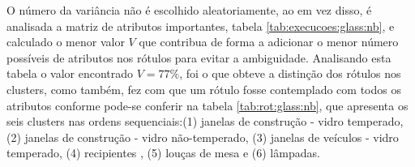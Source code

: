 \begin{table}[!h]
\centering
\caption{Matriz de Atributos Importantes do algoritmo Naive Bayes na base Glass}
\label{tab:execucoes:glass:nb}
\end{table}    


O número da variância não é escolhido aleatoriamente, ao em vez disso, é analisada a matriz de atributos importantes, tabela  \ref{tab:execucoes:glass:nb}, e calculado o menor valor ${V}$ que contribua de forma a adicionar o menor número possíveis de atributos nos rótulos para  evitar a ambiguidade. Analisando esta tabela o valor encontrado ${V=77\%}$, foi o que obteve a distinção dos rótulos nos clusters, como também, fez com que um rótulo fosse contemplado com todos os atributos conforme pode-se conferir na tabela \ref{tab:rot:glass:nb}, que apresenta os seis clusters nas ordens sequenciais:(1) janelas de construção - vidro temperado, (2) janelas de construção - vidro não-temperado, (3) janelas de veículos - vidro temperado, (4) recipientes , (5) louças de mesa e (6) lâmpadas. 

